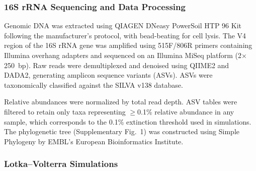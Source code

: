 \subsubsection*{16S rRNA Sequencing and Data Processing}
\label{sec:suppl:methods:sequencing}

Genomic DNA was extracted using QIAGEN DNeasy PowerSoil HTP 96 Kit following the manufacturer's protocol, with bead-beating for cell lysis. The V4 region of the 16S rRNA gene was amplified using 515F/806R primers containing Illumina overhang adapters and sequenced on an Illumina MiSeq platform (2$\times$250~bp). Raw reads were demultiplexed and denoised using QIIME2 and DADA2, generating amplicon sequence variants (ASVs). ASVs were taxonomically classified against the SILVA v138 database.

Relative abundances were normalized by total read depth. ASV tables were filtered to retain only taxa representing $\geq$0.1\% relative abundance in any sample, which corresponds to the 0.1\% extinction threshold used in simulations. The phylogenetic tree (Supplementary Fig.~1) was constructed using Simple Phylogeny by EMBL's European Bioinformatics Institute\citep{Madeira2022}.


\subsubsection*{Lotka--Volterra Simulations}
\label{sec:suppl:methods:simulations}

